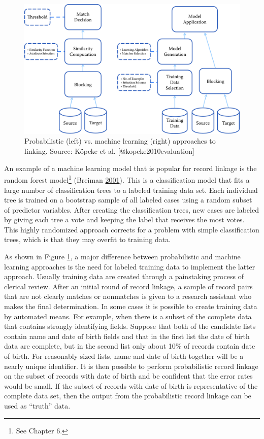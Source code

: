 \documentclass[]{krantz}
\begin{document}
\begin{figure}

{\centering \includegraphics[width=0.7\linewidth]{ChapterLinkage/figures/fig3-2} 

}

\caption{Probabilistic (left) vs. machine learning (right) approaches to linking. Source: Köpcke et al. [@kopcke2010evaluation]}\label{fig:fig3-2}
\end{figure}

\vspace*{-6pt} An example of a machine learning model that is popular
for record linkage is the random forest model\footnote{See Chapter 6.}
(Breiman \protect\hyperlink{ref-Breiman01}{2001}). This is a
classification model that fits a large number of classification trees to
a labeled training data set. Each individual tree is trained on a
bootstrap sample of all labeled cases using a random subset of predictor
variables. After creating the classification trees, new cases are
labeled by giving each tree a vote and keeping the label that receives
the most votes. This highly randomized approach corrects for a problem
with simple classification trees, which is that they may overfit to
training data.

As shown in Figure \ref{fig:fig3-2}, a major difference between
probabilistic and machine learning approaches is the need for labeled
training data to implement the latter approach. Usually training data
are created through a painstaking process of clerical review. After an
initial round of record linkage, a sample of record pairs that are not
clearly matches or nonmatches is given to a research assistant who makes
the final determination. In some cases it is possible to create training
data by automated means. For example, when there is a subset of the
complete data that contains strongly identifying fields. Suppose that
both of the candidate lists contain name and date of birth fields and
that in the first list the date of birth data are complete, but in the
second list only about 10\% of records contain date of birth. For
reasonably sized lists, name and date of birth together will be a nearly
unique identifier. It is then possible to perform probabilistic record
linkage on the subset of records with date of birth and be confident
that the error rates would be small. If the subset of records with date
of birth is representative of the complete data set, then the output
from the probabilistic record linkage can be used as ``truth'' data.
\end{document}
